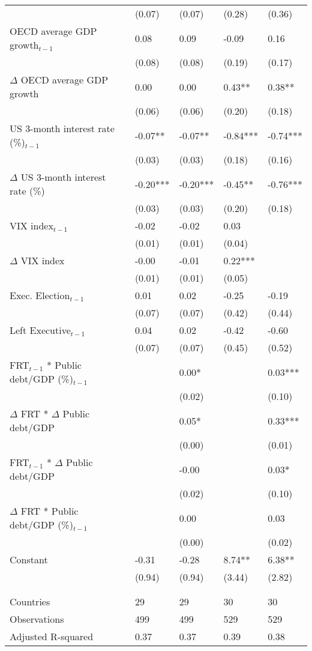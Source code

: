 \begin{tabular}{lp{3cm}p{3cm}p{3cm}p{3cm}}
   & (0.07) & (0.07) & (0.28) & (0.36) \\ 
  OECD average GDP growth$_{t-1}$ & 0.08 & 0.09 & -0.09 & 0.16 \\ 
   & (0.08) & (0.08) & (0.19) & (0.17) \\ 
  $\Delta$ OECD average GDP growth & 0.00 & 0.00 & 0.43** & 0.38** \\ 
   & (0.06) & (0.06) & (0.20) & (0.18) \\ 
  US 3-month interest rate (\%)$_{t-1}$ & -0.07** & -0.07** & -0.84*** & -0.74*** \\ 
   & (0.03) & (0.03) & (0.18) & (0.16) \\ 
  $\Delta$ US 3-month interest rate (\%) & -0.20*** & -0.20*** & -0.45** & -0.76*** \\ 
   & (0.03) & (0.03) & (0.20) & (0.18) \\ 
  VIX index$_{t-1}$ & -0.02 & -0.02 & 0.03 &  \\ 
   & (0.01) & (0.01) & (0.04) &  \\ 
  $\Delta$ VIX index & -0.00 & -0.01 & 0.22*** &  \\ 
   & (0.01) & (0.01) & (0.05) &  \\ 
  Exec. Election$_{t-1}$ & 0.01 & 0.02 & -0.25 & -0.19 \\ 
   & (0.07) & (0.07) & (0.42) & (0.44) \\ 
  Left Executive$_{t-1}$ & 0.04 & 0.02 & -0.42 & -0.60 \\ 
   & (0.07) & (0.07) & (0.45) & (0.52) \\ 
  FRT$_{t-1}$ * Public debt/GDP (\%)$_{t-1}$ &  & 0.00* &  & 0.03*** \\ 
   &  & (0.02) &  & (0.10) \\ 
  $\Delta$ FRT * $\Delta$ Public debt/GDP &  & 0.05* &  & 0.33*** \\ 
   &  & (0.00) &  & (0.01) \\ 
  FRT$_{t-1}$ * $\Delta$ Public debt/GDP &  & -0.00 &  & 0.03* \\ 
   &  & (0.02) &  & (0.10) \\ 
  $\Delta$ FRT * Public debt/GDP (\%)$_{t-1}$ &  & 0.00 &  & 0.03 \\ 
   &  & (0.00) &  & (0.02) \\ 
  Constant & -0.31 & -0.28 & 8.74** & 6.38** \\ 
   & (0.94) & (0.94) & (3.44) & (2.82) \\ 
   &  &  &  &  \\ 
   &  &  &  &  \\ 
  Countries & 29 & 29 & 30 & 30 \\ 
  Observations & 499 & 499 & 529 & 529 \\ 
  Adjusted R-squared & 0.37 & 0.37 & 0.39 & 0.38 \\ 
   \hline
\end{tabular}
\endgroup
